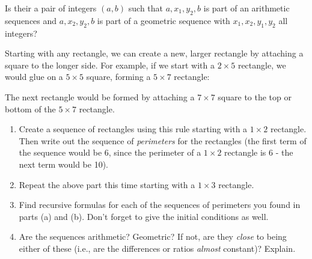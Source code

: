 \documentclass[11pt,]{book}
\theoremstyle{ptxplainnotitle}
\theoremstyle{ptxplaintitle}
\theoremstyle{ptxdefinitionnotitle}
\theoremstyle{ptxdefinitiontitle}
\theoremstyle{ptxdefinitionnotitle}
\theoremstyle{ptxdefinitiontitle}
\theoremstyle{ptxdefinitionnotitle}
\theoremstyle{ptxdefinitiontitle}
\theoremstyle{ptxdefinitiontitlenonumber}
\theoremstyle{ptxdefinitiontitlenonumber}
\numberwithin{equation}{chapter}
\begin{document}
\begin{divisionexercise}{10}\hypertarget{exercise-22}{}
\hypertarget{p-312}{}%
Is their a pair of integers \((a,b)\) such that \(a, x_1, y_2, b\) is part of an arithmetic sequences and \(a, x_2, y_2, b\) is part of a geometric sequence with \(x_1, x_2, y_1, y_2\) all integers?%
\end{divisionexercise}%
\begin{divisionexercise}{11}\hypertarget{exercise-23}{}
\hypertarget{p-313}{}%
Starting with any rectangle, we can create a new, larger rectangle by attaching a square to the longer side. For example, if we start with a \(2\times 5\) rectangle, we would glue on a \(5\times 5\) square, forming a \(5 \times 7\) rectangle:%
\begin{sidebyside}{1}{0.2}{0.2}{0}
\begin{sbspanel}{0.6}
\end{sbspanel}
\end{sidebyside}
\par
\hypertarget{p-314}{}%
The next rectangle would be formed by attaching a \(7 \times 7\) square to the top or bottom of the \(5\times 7\) rectangle.  \leavevmode%
\begin{enumerate}[label=(\alph*)]
\item\hypertarget{li-164}{}\hypertarget{p-315}{}%
Create a sequence of rectangles using this rule starting with a \(1\times 2\) rectangle. Then write out the sequence of \emph{perimeters} for the rectangles (the first term of the sequence would be 6, since the perimeter of a \(1\times 2\) rectangle is 6 - the next term would be 10). %
\item\hypertarget{li-165}{}\hypertarget{p-316}{}%
Repeat the above part this time starting with a \(1 \times 3\) rectangle. %
\item\hypertarget{li-166}{}\hypertarget{p-317}{}%
Find recursive formulas for each of the sequences of perimeters you found in parts (a) and (b). Don't forget to give the initial conditions as well. %
\item\hypertarget{li-167}{}\hypertarget{p-318}{}%
Are the sequences arithmetic? Geometric? If not, are they \emph{close} to being either of these (i.e., are the differences or ratios \emph{almost} constant)? Explain. %
\end{enumerate}
%
\end{divisionexercise}%
\end{document}

